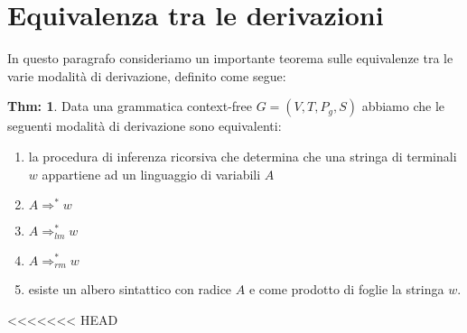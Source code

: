 \documentclass[a4paper]{book}
\theoremstyle{definition}%
\newtheorem{thm}{Thm:}[chapter]
\begin{document}
  \section{Equivalenza tra le derivazioni}
  In questo paragrafo consideriamo un importante teorema sulle equivalenze tra le varie modalità di derivazione, definito come segue:
  \begin{thm}
    Data una grammatica context-free $G = (V, T,P_g,S)$ abbiamo che le seguenti modalità di derivazione sono equivalenti:
    \begin{enumerate}
    \item la procedura di inferenza ricorsiva che determina che una stringa di terminali $w$ appartiene ad un linguaggio di variabili $A$
    \item $A \Rightarrow ^ * w$
    \item $A \Rightarrow _{lm} ^ * w$
    \item $A \Rightarrow _{rm} ^ * w$
    \item esiste un albero sintattico con radice $A$ e come prodotto di foglie la stringa $w$.
    \end{enumerate}
  \end{thm}
<<<<<<< HEAD
\end{document}
